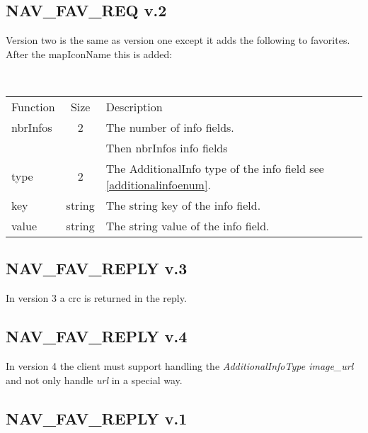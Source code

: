 \documentclass[a4paper]{article}
\begin{document}
\subsection{NAV\_FAV\_REQ v.2}
\label{NAV_FAV_REQ_2}

Version two is the same as version one except it adds the following to 
favorites. After the mapIconName this is added: 

~

\begin{centering}
\begin{tabular}{|l|c|p{7cm}|}
\hline
Function    & Size    & Description                    \\
nbrInfos    & 2       & The number of info fields.     \\\hline
            &         & Then nbrInfos info fields   \\\hline
type        & 2       & The AdditionalInfo type of the info field see \ref{additionalinfoenum}. \\\hline
key        & string  & The string key of the info field. \\\hline
value      & string  & The string value of the info field. \\\hline
\end{tabular}
\end{centering}

\subsection{NAV\_FAV\_REPLY v.3}

In version 3 a crc is returned in the reply.

\subsection{NAV\_FAV\_REPLY v.4}

In version 4 the client must support handling the \emph{AdditionalInfoType 
image\_url} and not only handle \emph{url} in a special way.


\subsection{NAV\_FAV\_REPLY v.1}
\end{document}
